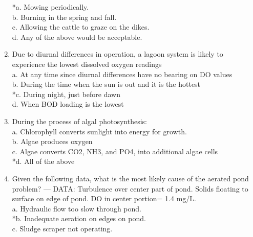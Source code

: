 \begin{enumerate}
*a. Mowing periodically. \\

b. Burning in the spring and fall. \\

c. Allowing the cattle to graze on the dikes. \\

d. Any of the above would be acceptable. \\


\item  Due to diurnal differences in operation, a lagoon system is likely to experience the lowest dissolved oxygen readings \\


a. At any time since diurnal differences have no bearing on DO values \\

b. During the time when the sun is out and it is the hottest \\

*c. During night, just before dawn \\

d. When BOD loading is the lowest \\


\item  During the process of algal photosynthesis: \\


a. Chlorophyll converts sunlight into energy for growth. \\

b. Algae produces oxygen \\

c. Algae converts CO2, NH3, and PO4, into additional algae cells \\

*d. All of the above \\


\item  Given the following data, what is the most likely cause of the aerated pond problem? ---
DATA: Turbulence over center part of pond.  Solids floating to surface on edge of pond.  DO in center portion= 1.4 mg/L. \\


a. Hydraulic flow too slow through pond. \\

*b. Inadequate aeration on edges on pond. \\

c. Sludge scraper not operating. \\


\end{enumerate}
